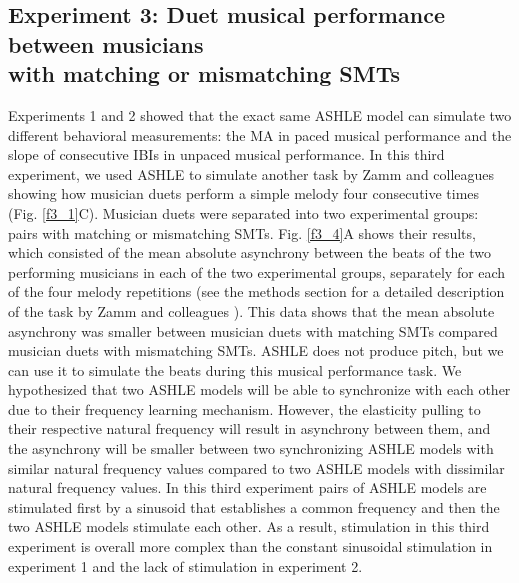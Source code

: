 \documentclass{report}
\begin{document}
\subsection{Experiment 3: Duet musical performance between musicians \\ with matching or mismatching SMTs}

Experiments 1 and 2 showed that the exact same ASHLE model can simulate two different behavioral measurements: the MA in paced musical performance and the slope of consecutive IBIs in unpaced musical performance. In this third experiment, we used ASHLE to simulate another task by Zamm and colleagues \cite{zamm2016endogenous} showing how musician duets perform a simple melody four consecutive times (Fig.{} \ref{f3_1}C). Musician duets were separated into two experimental groups: pairs with matching or mismatching SMTs. Fig.{} \ref{f3_4}A shows their results, which consisted of the mean absolute asynchrony between the beats of the two performing musicians in each of the two experimental groups, separately for each of the four melody repetitions (see the methods section for a detailed description of the task by Zamm and colleagues \cite{zamm2016endogenous}). This data shows that the mean absolute asynchrony was smaller between musician duets with matching SMTs compared musician duets with mismatching SMTs. ASHLE does not produce pitch, but we can use it to simulate the beats during this musical performance task. We hypothesized that two ASHLE models will be able to synchronize with each other due to their frequency learning mechanism. However, the elasticity pulling to their respective natural frequency will result in asynchrony between them, and the asynchrony will be smaller between two synchronizing ASHLE models with similar natural frequency values compared to two ASHLE models with dissimilar natural frequency values. In this third experiment pairs of ASHLE models are stimulated first by a sinusoid that establishes a common frequency and then the two ASHLE models stimulate each other. As a result, stimulation in this third experiment is overall more complex than the constant sinusoidal stimulation in experiment 1 and the lack of stimulation in experiment 2.
\end{document}
